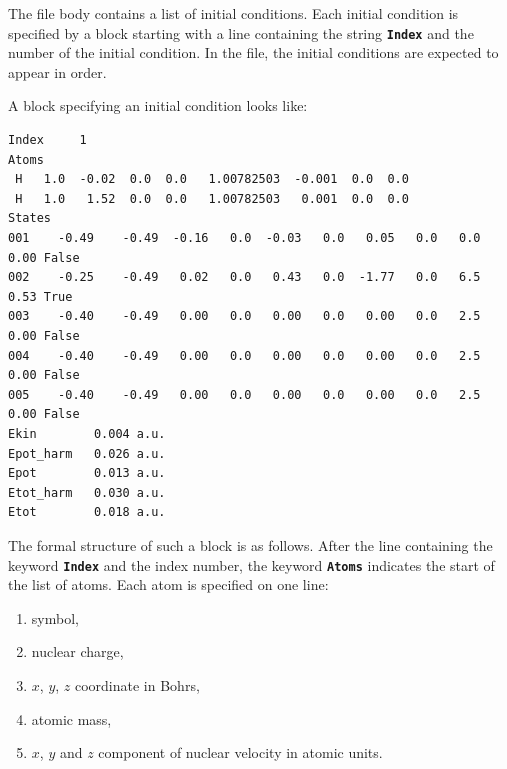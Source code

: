 \documentclass[a4paper,10pt,DIV=15,openany]{scrbook}
\newcommand{\ttt}[1]{\textbf{\texttt{#1}}}
\newenvironment{example}{
  \setlength{\OuterFrameSep}{3pt}
  \vspace{0mm}
  \definecolor{shadecolor}{HTML}{E4F4FF}
  \begin{shaded}
}{
  \end{shaded}
}
\begin{document}
The file body contains a list of initial conditions. Each initial condition is specified by a block starting with a line containing the string \ttt{Index} and the number of the initial condition. In the file, the initial conditions are expected to appear in order.

A block specifying an initial condition looks like:
\begin{example}
\footnotesize\begin{verbatim}
Index     1
Atoms
 H   1.0  -0.02  0.0  0.0   1.00782503  -0.001  0.0  0.0
 H   1.0   1.52  0.0  0.0   1.00782503   0.001  0.0  0.0
States
001    -0.49    -0.49  -0.16   0.0  -0.03   0.0   0.05   0.0   0.0   0.00 False
002    -0.25    -0.49   0.02   0.0   0.43   0.0  -1.77   0.0   6.5   0.53 True
003    -0.40    -0.49   0.00   0.0   0.00   0.0   0.00   0.0   2.5   0.00 False
004    -0.40    -0.49   0.00   0.0   0.00   0.0   0.00   0.0   2.5   0.00 False
005    -0.40    -0.49   0.00   0.0   0.00   0.0   0.00   0.0   2.5   0.00 False
Ekin        0.004 a.u.
Epot_harm   0.026 a.u.
Epot        0.013 a.u.
Etot_harm   0.030 a.u.
Etot        0.018 a.u.
\end{verbatim}
\end{example}
The formal structure of such a block is as follows. After the line containing the keyword \ttt{Index} and the index number, the keyword \ttt{Atoms} indicates the start of the list of atoms. Each atom is specified on one line:
\begin{enumerate}
  \item symbol,
  \item nuclear charge,
  \item $x$, $y$, $z$ coordinate in Bohrs,
  \item atomic mass,
  \item $x$, $y$ and $z$ component of nuclear velocity in atomic units.
\end{enumerate}
\end{document}
